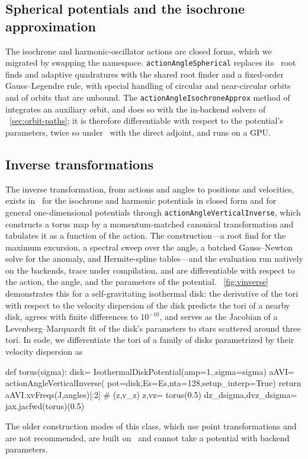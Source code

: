 \subsection{Spherical potentials and the isochrone approximation}\label{sec:aa-other}

The isochrone and harmonic-oscillator actions are closed forms, which we
migrated by swapping the namespace. \texttt{actionAngleSpherical}
replaces its \scipy\ root finds and adaptive quadratures with the
shared root finder and a fixed-order Gauss--Legendre rule, with special
handling of circular and near-circular orbits and of orbits that are
unbound. The
\texttt{actionAngleIsochroneApprox} method of \citet{Bovy2014}
integrates an auxiliary orbit, and does so with the in-backend solvers
of \sectionname~\ref{sec:orbit-paths}; it is therefore differentiable
with respect to the potential's parameters, twice so under \jax\ with
the direct adjoint, and runs on a GPU.

\subsection{Inverse transformations}\label{sec:aa-inverse}

The inverse transformation, from actions and angles to positions and
velocities, exists in \galpy\ for the isochrone and harmonic potentials
in closed form and for general one-dimensional potentials through
\texttt{actionAngleVerticalInverse}, which constructs a torus map by a
momentum-matched canonical transformation and tabulates it as a
function of the action. The construction---a root find for the maximum
excursion, a spectral sweep over the angle, a batched Gauss--Newton
solve for the anomaly, and Hermite-spline tables---and the evaluation
run natively on the backends, trace under compilation, and are
differentiable with respect to the action, the angle, and the
parameters of the potential. \figurename~\ref{fig:vinverse} demonstrates this for a
self-gravitating isothermal disk: the derivative of the tori with
respect to the velocity dispersion of the disk predicts the tori of a
nearby disk, agrees with finite differences to $10^{-10}$, and serves
as the Jacobian of a Levenberg--Marquardt fit of the disk's parameters to
stars scattered around three tori. In code, we differentiate the tori of
a family of disks parametrized by their velocity dispersion as
\begin{code}
def torus(sigma):
    disk= IsothermalDiskPotential(amp=1.,sigma=sigma)
    aAVI= actionAngleVerticalInverse(
        pot=disk,Es=Es,nta=128,setup_interp=True)
    return aAVI.xvFreqs(J,angles)[:2] # (z,v_z)
z,vz= torus(0.5)
dz_dsigma,dvz_dsigma= jax.jacfwd(torus)(0.5)
\end{code}
The older construction modes of this class, which use point
transformations and are not recommended, are built on \numpy\ and
cannot take a potential with backend parameters.

